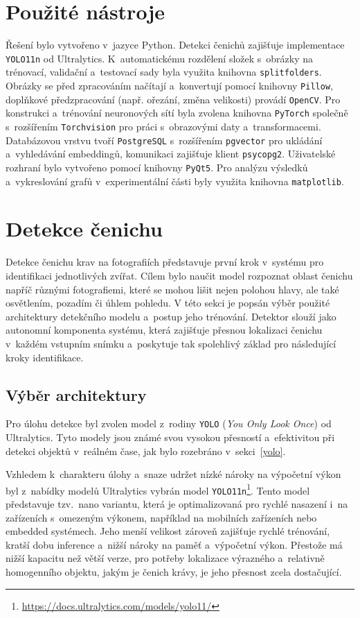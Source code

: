 \section{Použité nástroje}
\label{tools}
Řešení bylo vytvořeno v~jazyce Python. Detekci čenichů zajišťuje implementace \texttt{YOLO11n} od Ultralytics. K~automatickému rozdělení složek s~obrázky na trénovací, validační a~testovací sady byla využita knihovna \texttt{splitfolders}. Obrázky se před zpracováním načítají a~konvertují pomocí knihovny \texttt{Pillow}, doplňkové předzpracování (např. ořezání, změna velikosti) provádí \texttt{OpenCV}. Pro konstrukci a~trénování neuronových sítí byla zvolena knihovna \texttt{PyTorch} společně s~rozšířením \texttt{Torchvision} pro práci s~obrazovými daty a~transformacemi. Databázovou vrstvu tvoří \texttt{PostgreSQL} s~rozšířením \texttt{pgvector} pro ukládání a~vyhledávání embeddingů, komunikaci zajišťuje klient \texttt{psycopg2}. Uživatelské rozhraní bylo vytvořeno pomocí knihovny \texttt{PyQt5}. Pro analýzu výsledků a~vykreslování grafů v~experimentální části byly využita knihovna \texttt{matplotlib}.

\section{Detekce čenichu}
\label{muzzleDetection}
Detekce čenichu krav na fotografiích představuje první krok v~systému pro identifikaci jednotlivých zvířat. Cílem bylo naučit model rozpoznat oblast čenichu napříč různými fotografiemi, které se mohou lišit nejen polohou hlavy, ale také osvětlením, pozadím či úhlem pohledu.
V této sekci je popsán výběr použité architektury detekčního modelu a~postup jeho trénování. Detektor slouží jako autonomní komponenta systému, která zajišťuje přesnou lokalizaci čenichu v~každém vstupním snímku a~poskytuje tak spolehlivý základ pro následující kroky identifikace.

\subsection*{Výběr architektury} 
Pro úlohu detekce byl zvolen model z~rodiny \texttt{YOLO} (\textit{You Only Look Once}) od Ultralytics. Tyto modely jsou známé svou vysokou přesností a~efektivitou při detekci objektů v~reálném čase, jak bylo rozebráno v~sekci~\ref{yolo}.

Vzhledem k~charakteru úlohy a~snaze udržet nízké nároky na výpočetní výkon byl z~nabídky modelů Ultralytics vybrán model \texttt{YOLO11n}\footnote{\url{https://docs.ultralytics.com/models/yolo11/}}. Tento model představuje tzv.~nano variantu, která je optimalizovaná pro rychlé nasazení i~na zařízeních s~omezeným výkonem, například na mobilních zařízeních nebo embedded systémech. Jeho menší velikost zároveň zajišťuje rychlé trénování, kratší dobu inference a~nižší nároky na paměť a~výpočetní výkon. Přestože má nižší kapacitu než větší verze, pro potřeby lokalizace výrazného a~relativně homogenního objektu, jakým je čenich krávy, je jeho přesnost zcela dostačující.

